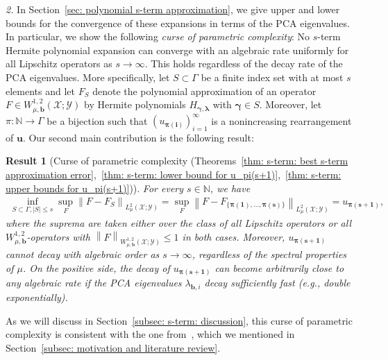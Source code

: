 \documentclass[namedate,webpdf]{ima-authoring-template-blank}
\newcommand*{\nm}[1]{{\left\|#1\right \|}}
\newcommand{\abs}[1]{\left|#1\right|}
\numberwithin{counter}{section}
\numberwithin{equation}{section}
\theoremstyle{plain}
\newtheorem{result}{Result}
\theoremstyle{definition}
\newcommand*{\cX}{\mathcal{X}}
\newcommand*{\cY}{\mathcal{Y}}
\newcommand*{\bbN}{\mathbb{N}}
\theoremstyle{thmstyletwo}
\begin{document}
\noindent\textit{2.}
In Section~\ref{sec: polynomial s-term approximation}, we give upper and lower bounds for the convergence of these expansions in terms of the PCA eigenvalues. 
In particular, we show the following \emph{curse of parametric complexity}: No \(s\)-term Hermite polynomial expansion can converge with an algebraic rate uniformly for all Lipschitz operators as \(s \to \infty\). This holds regardless of the decay rate of the PCA eigenvalues.
More specifically, let \(S \subset \Gamma\) be a finite index set with at most \(s\) elements and let \(F_S\) denote the polynomial approximation of an operator \(F \in W_{\mu, \bm{b}}^{1, 2}(\cX; \cY)\) by Hermite polynomials \( H_{\bm{\gamma}, \bm{\lambda}} \) with \( \bm{\gamma} \in S \). Moreover, let \(\pi: \bbN \to \Gamma\) be a bijection such that \((u_{\bm{\pi(i)}})_{i=1}^{\infty}\) is a nonincreasing rearrangement of \(\bm{u}\). Our second main contribution is the following result:

\begin{result}[Curse of parametric complexity (Theorems~\ref{thm: s-term: best s-term approximation error},~\ref{thm: s-term: lower bound for u_pi(s+1)},~\ref{thm: s-term: upper bounds for u_pi(s+1)})]
\label{res: best polynomial s-term error; informal}
    For every \(s \in \bbN\), we have
    \begin{align*}
        \inf_{S \subset \Gamma, \abs{S} \leq s} \sup_F
        \nm{F - F_S}_{L_{\mu}^2(\cX; \cY)} 
        = \sup_F
        \nm{F - F_{\{\bm{\pi(1)}, \dots, \bm{\pi(s)}\}}}_{L_{\mu}^2(\cX; \cY)}
        = u_{\bm{\pi(s + 1)}},
    \end{align*}
    where the suprema are taken either over the class of all Lipschitz operators or all \(W_{\mu, \bm{b}}^{1, 2}\)-operators with \(\nm{F}_{W_{\mu, \bm{b}}^{1, 2}(\cX; \cY)} \leq 1\) in both cases. 
    Moreover, \(u_{\bm{\pi(s + 1)}}\) cannot decay with algebraic order as \(s \rightarrow \infty\), regardless of the spectral properties of \(\mu\). On the positive side, the decay of \(u_{\bm{\pi(s + 1)}}\) can become arbitrarily close to any algebraic rate if the PCA eigenvalues \(\lambda_{\bm{b}, i}\) decay sufficiently fast (e.g., double exponentially).
\end{result}

As we will discuss in Section~\ref{subsec: s-term: discussion}, this curse of parametric complexity is consistent with the one from~\cite{lanthaler_OperatorLearningPCANetUpper_2023}, which we mentioned in Section~\ref{subsec: motivation and literature review}.\\
\end{document}
